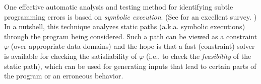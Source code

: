 One effective automatic analysis and testing method for identifying subtle programming errors is based on \emph{symbolic execution}.
(See \cite{symbex-survey} for an excellent survey. )
In a nutshell, this technique analyzes static paths
(a.k.a. symbolic executions) through the program being considered. %
Such a path can be viewed as a constraint $\varphi$ (over
appropriate data domains) and the hope is that a fast (constraint)
solver is available for checking the satisfiability of $\varphi$ (i.e., to check
the \emph{feasibility} of the static path), which can be used for generating
inputs that lead to certain parts of the program or an erroneous behavior.







